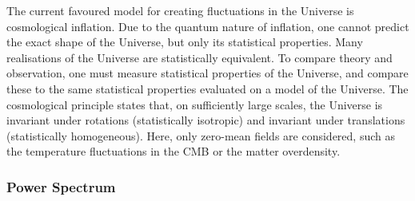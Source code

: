 The current favoured model for creating fluctuations in the Universe is cosmological inflation.
Due to the quantum nature of inflation, one cannot predict the exact shape of the Universe, but only its statistical properties.
Many realisations of the Universe are statistically equivalent.
To compare theory and observation, one must measure statistical properties of the Universe, and compare these to the same statistical properties evaluated on a model of the Universe.
The cosmological principle states that, on sufficiently large scales, the Universe is invariant under rotations (statistically isotropic) and invariant under translations (statistically homogeneous).
Here, only zero-mean fields are considered, such as the temperature fluctuations in the CMB or the matter overdensity.

\subsubsection{Power Spectrum}


